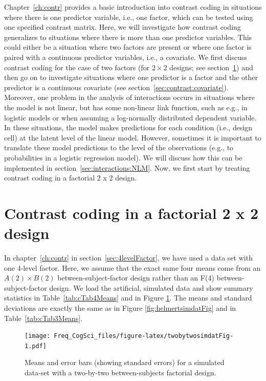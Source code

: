 \documentclass[12pt,]{krantz}
\begin{document}
Chapter~\ref{ch:contr} provides a basic introduction into contrast coding in situations where there is one predictor variable, i.e., one factor, which can be tested using one specified contrast matrix. Here, we will investigate how contrast coding generalizes to situations where there is more than one predictor variables. This could either be a situation where two factors are present or where one factor is paired with a continuous predictor variables, i.e., a covariate. We first discuss contrast coding for the case of two factors (for \(2 \times 2\) designs; see section~\ref{sec:MR:ANOVA}) and then go on to investigate situations where one predictor is a factor and the other predictor is a continuous covariate (see section~\ref{sec:contrast:covariate}). Moreover, one problem in the analysis of interactions occurs in situations where the model is not linear, but has some non-linear link function, such as e.g., in logistic models or when assuming a log-normally distributed dependent variable. In these situations, the model makes predictions for each condition (i.e., design cell) at the latent level of the linear model. However, sometimes it is important to translate these model predictions to the level of the observations (e.g., to probabilities in a logistic regression model). We will discuss how this can be implemented in section~\ref{sec:interactions:NLM}. Now, we first start by treating contrast coding in a factorial 2 x 2 design.

\hypertarget{sec:MR:ANOVA}{%
\section{Contrast coding in a factorial 2 x 2 design}\label{sec:MR:ANOVA}}

In chapter~\ref{ch:contr} in section~\ref{sec:4levelFactor}, we have used a data set with one 4-level factor. Here, we assume that the exact same four means come from an \(A(2) \times B(2)\) between-subject-factor design rather than an F(4) between-subject-factor design. We load the artificial, simulated data and show summary statistics in Table~\ref{tab:cTab4Means} and in Figure \ref{fig:twobytwosimdatFig}. The means and standard deviations are exactly the same as in Figure \ref{fig:helmertsimdatFig} and in Table~\ref{tab:cTab3Means}.

\begin{figure}
\centering
\texttt{[image: Freq\_CogSci\_files/figure-latex/twobytwosimdatFig-1.pdf]}
\caption{\label{fig:twobytwosimdatFig}Means and error bars (showing standard errors) for a simulated data-set with a two-by-two between-subjects factorial design.}
\end{figure}
\end{document}
